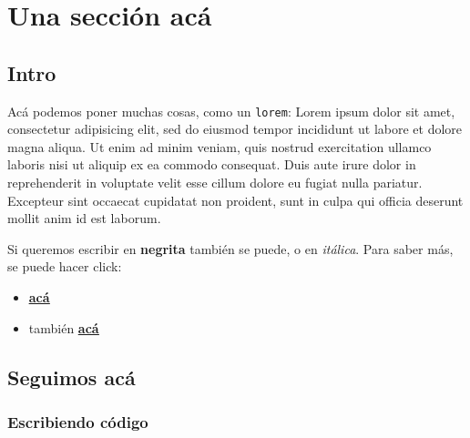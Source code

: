 






\clearpage
\tableofcontents
\clearpage 

\lstset{style=MyStyle}

\section{Una sección acá}

\subsection{Intro}

Acá podemos poner muchas cosas, como un \texttt{lorem}: Lorem ipsum dolor sit amet, consectetur adipisicing elit, sed do eiusmod tempor incididunt ut labore et dolore magna aliqua. Ut enim ad minim veniam, quis nostrud exercitation ullamco laboris nisi ut aliquip ex ea commodo consequat. Duis aute irure dolor in reprehenderit in voluptate velit esse cillum dolore eu fugiat nulla pariatur. Excepteur sint occaecat cupidatat non proident, sunt in culpa qui officia deserunt mollit anim id est laborum.

Si queremos escribir en \textbf{negrita} también se puede, o en \emph{itálica}. Para saber más, se puede hacer click:

\begin{itemize}
    \item \underline{\textbf{\href{https://www.overleaf.com/learn/latex/Bold,_italics_and_underlining}{acá}}}
    \item también \underline{\textbf{\href{http://www.sascha-frank.com/latex-italics.html}{acá}}}
\end{itemize}

\subsection{Seguimos acá}

\subsubsection{Escribiendo código}

